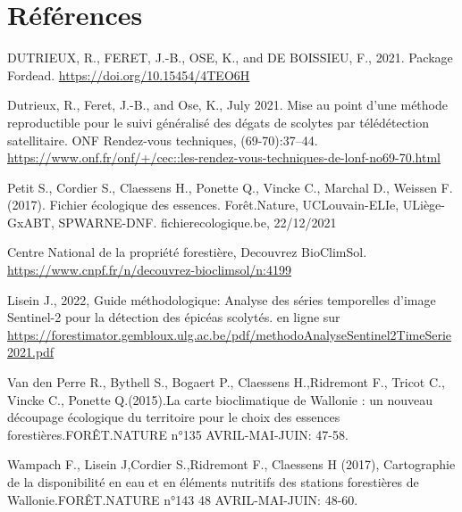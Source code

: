 \section{Références}


\noindent DUTRIEUX, R., FERET, J.-B., OSE, K., and DE BOISSIEU, F., 2021.
Package Fordead. \url{https://doi.org/10.15454/4TEO6H} \vspace{\baselineskip}

\noindent Dutrieux, R., Feret, J.-B., and Ose, K., July 2021. Mise au
point d’une méthode reproductible pour le suivi généralisé des
dégats de scolytes par télédétection satellitaire. ONF Rendez-vous
techniques, (69-70):37–44.  \url{https://www.onf.fr/onf/+/cec::les-rendez-vous-techniques-de-lonf-no69-70.html} \vspace{\baselineskip}


\noindent Petit S., Cordier S., Claessens H., Ponette Q., Vincke C., Marchal D., Weissen F. (2017). Fichier écologique des essences. Forêt.Nature, UCLouvain-ELIe, ULiège-GxABT, SPWARNE-DNF. fichierecologique.be, 22/12/2021 \vspace{\baselineskip}

\noindent Centre National de la propriété forestière, Decouvrez BioClimSol. \url{https://www.cnpf.fr/n/decouvrez-bioclimsol/n:4199} \vspace{\baselineskip}

\noindent Lisein J., 2022, Guide méthodologique: Analyse des séries temporelles d'image Sentinel-2 pour la détection des épicéas scolytés. en ligne sur \url{ https://forestimator.gembloux.ulg.ac.be/pdf/methodoAnalyseSentinel2TimeSerie2021.pdf}\vspace{\baselineskip}

\noindent Van den Perre R., Bythell S., Bogaert P., Claessens H.,Ridremont F., Tricot C., Vincke C., Ponette Q.(2015).La carte bioclimatique de Wallonie : un nouveau découpage écologique du territoire pour le choix des essences forestières.FORÊT.NATURE n°135
AVRIL-MAI-JUIN: 47-58.\vspace{\baselineskip}

\noindent Wampach F., Lisein J,Cordier S.,Ridremont F., Claessens H (2017), Cartographie de la disponibilité en eau et en éléments nutritifs des stations forestières de Wallonie.FORÊT.NATURE n°143 48 AVRIL-MAI-JUIN: 48-60.\vspace{\baselineskip}